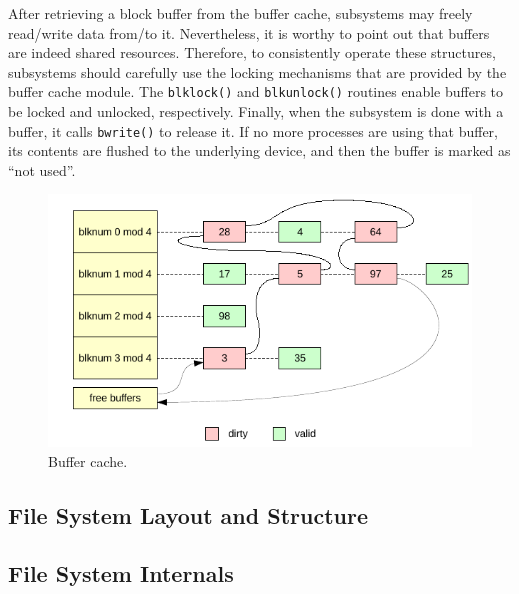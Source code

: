 \documentclass[10pt,a4paper]{article}
\begin{document}
After retrieving a block buffer from the buffer cache, subsystems may freely read/write data from/to it. Nevertheless, it is worthy to point out that buffers are indeed shared resources. Therefore, to consistently operate these structures, subsystems should carefully use the locking mechanisms that are provided by the buffer cache module. The \texttt{blklock()} and \texttt{blkunlock()} routines enable buffers to be locked and unlocked, respectively. Finally, when the subsystem is done with a buffer, it calls \texttt{bwrite()} to release it. If no more processes are using that buffer, its contents are flushed to the underlying device, and then the buffer is marked as ``not used''.


\begin{figure}
	\centering
	\includegraphics[scale=1]{img/buffer-cache}
	\caption{Buffer cache.}
	\label{figure: buffer cache}
\end{figure}

\subsection{File System Layout and Structure}
\label{subsection: file system layout and structure}

\subsection{File System Internals}
\label{subsection: file system internals}

\printbibliography
\end{document}

